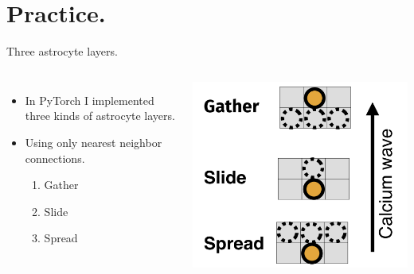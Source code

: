 \documentclass[10pt]{beamer}
\begin{document}
\section[In practice.]{Practice.}
\begin{frame}[fragile]{Three astrocyte layers.}
\begin{columns}
\begin{itemize}
\item In PyTorch I implemented three kinds of astrocyte layers.
\item \alert{Using only} nearest neighbor connections.
\begin{enumerate}
    \item Gather
    \item Slide
    \item Spread
\end{enumerate}
\end{itemize}
\centering
\includegraphics[scale=0.25]{images/layers.png} 
\end{columns}
\end{frame}
\end{document}
